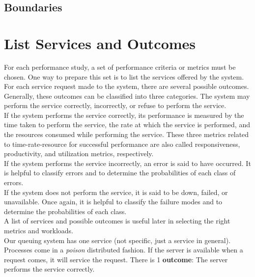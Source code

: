 \documentclass[13pt,a4paper]{article}
\begin{document}
		\subsection{Boundaries}
	\section{List Services and Outcomes}
		For each performance study, a set of performance criteria or metrics must be chosen. One way to prepare this set is to list the services offered by the system. For each service request made to the system, there are several possible outcomes. Generally, these outcomes can be classified into three categories. The system may perform the service correctly, incorrectly, or refuse to perform the service.\\
		If the system performs the service correctly, its performance is measured by the time taken to perform the service, the rate at which the service is performed, and the resources consumed while performing the service. These three metrics related to time-rate-resource for successful performance are also called responsiveness, productivity, and utilization metrics, respectively.\\
		If the system performs the service incorrectly, an error is said to have occurred. It is helpful to classify errors and to determine the probabilities of each class of errors. \\
		If the system does not perform the service, it is said to be down, failed, or unavailable. Once again, it is helpful to classify the failure modes and to determine the probabilities of each class.\\
		A list of services and possible outcomes is useful later in selecting the right metrics and workloads.\\
		Our queuing system has one service (not specific, just a service in general). Processes come in a \textit{poison} distributed fashion. If the server is available when a request comes, it will service the request. There is 1 \textbf{outcome}: The server performs the service correctly.
\end{document}

